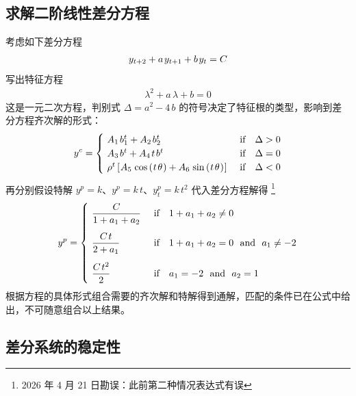 \subsection{求解二阶线性差分方程}

考虑如下差分方程
\begin{align*}
    y\nnt+a\,y\nt+b\,y_t=C
\end{align*}
写出特征方程
\begin{align*}
    \lambda^2+a\,\lambda+b=0
\end{align*}
这是一元二次方程，判别式 \(\Delta=a^2-4\,b\) 的符号决定了特征根的类型，影响到差分方程齐次解的形式：
\begin{equation*}
    y^c=\begin{cases}
        \ A_1\,b^t_1+A_2\,b^t_2 & \n{ if}\quad \Delta>0\\
        \ A_3\,b^t + A_4\,t\,b^t & \n{ if}\quad \Delta=0\\
        \ \rho^t\bks{A_5\,\cos\bka{t\,\theta} + A_6\,\sin\bka{t\,\theta}} & \n{ if}\quad \Delta<0
    \end{cases}
\end{equation*}
再分别假设特解 \(y^p=k\)、\(y^p=k\,t\)、\(y^p_t=k\,t^2\) 代入差分方程解得 \footnote{2026 年 4 月 21 日勘误：此前第二种情况表达式有误}
\begin{equation*}
    y^p=\begin{cases}
       \ \dfrac C{1+a_1+a_2} & \n{ if}\quad 1+a_1+a_2\neq 0\\[3ex]
       \ \dfrac {C\,t}{2+a_1} & \n{ if}\quad 1+a_1+a_2=0\ \n{ and }\ a_1\neq-2\\[3ex]
       \ \dfrac {C\,t^2 }{2}& \n{ if}\quad a_1=-2\ \n{ and }\ a_2=1
    \end{cases}
\end{equation*}
根据方程的具体形式组合需要的齐次解和特解得到通解，匹配的条件已在公式中给出，不可随意组合以上结果。

\subsection{差分系统的稳定性}


